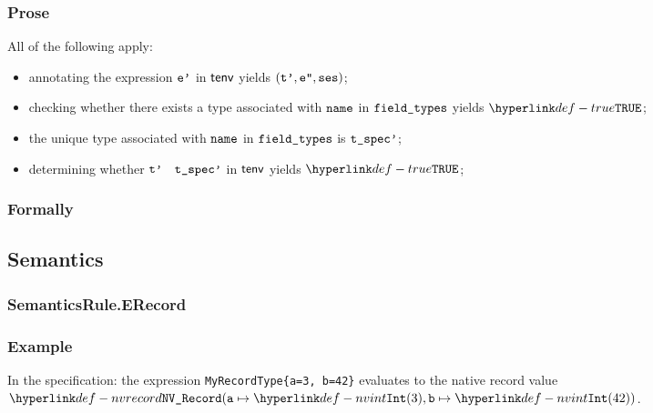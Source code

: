 \subsubsection{Prose}
All of the following apply:
\begin{itemize}
  \item annotating the expression $\vep$ in $\tenv$ yields $(\vtp, \vepp, \vses)$\ProseOrTypeError;
  \item checking whether there exists a type associated with $\name$ in $\fieldtypes$ yields $\True$\ProseOrTypeError;
  \item the unique type associated with $\name$ in $\fieldtypes$ is $\tspecp$;
  \item determining whether $\vtp$ \typesatisfies\ $\tspecp$ in $\tenv$ yields $\True$\ProseOrTypeError;
\end{itemize}

\subsubsection{Formally}
\begin{mathpar}
\end{mathpar}

\subsection{Semantics}
\subsubsection{SemanticsRule.ERecord \label{sec:SemanticsRule.ERecord}}
\subsubsection{Example}
In the specification:
the expression \verb|MyRecordType{a=3, b=42}| evaluates to the native record value \\
$\nvrecord{\va\mapsto\nvint(3), \vb\mapsto\nvint(42)}$.


